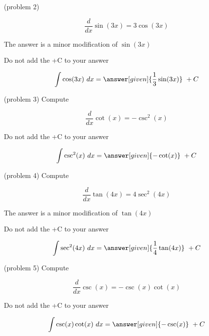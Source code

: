 \documentclass{ximera}
\begin{document}
\begin{problem}(problem 2)

\begin{hint}
\[
\frac{d}{dx} \sin(3x) = 3\cos(3x)
\]
\end{hint}
\begin{hint}
The answer is a minor modification of $\sin(3x)$
\end{hint}
\begin{hint}
\begin{center}
Do not add the +C to your answer
\end{center}
\end{hint}

\[
\int \cos(3x) \ dx =
\answer[given]{\frac13 \sin(3x)} \ + C
\]
\end{problem}



\begin{problem}(problem 3)
Compute 

\begin{hint}
\[
\frac{d}{dx} \cot(x) = -\csc^2(x)
\]
\end{hint}
\begin{hint}
\begin{center}
Do not add the +C to your answer
\end{center}
\end{hint}

\[
\int \csc^2(x) \ dx =
\answer[given]{-\cot(x)} \ + C
\]
\end{problem}

\begin{problem}(problem 4)
Compute 

\begin{hint}
\[
\frac{d}{dx} \tan(4x) = 4\sec^2(4x)
\]
\end{hint}
\begin{hint}
The answer is a minor modification of $\tan(4x)$
\end{hint}
\begin{hint}
\begin{center}
Do not add the +C to your answer
\end{center}
\end{hint}

\[
\int \sec^2(4x) \ dx =
\answer[given]{\frac14\tan(4x)} \ + C
\]
\end{problem}




\begin{problem}(problem 5)
Compute 

\begin{hint}
\[
\frac{d}{dx} \csc(x) = -\csc(x)\cot(x)
\]
\end{hint}
\begin{hint}
\begin{center}
Do not add the +C to your answer
\end{center}
\end{hint}

\[
\int \csc(x)\cot(x) \ dx =
\answer[given]{-\csc(x)} \ + C
\]
\end{problem}
\end{document}
